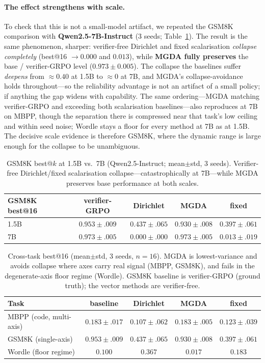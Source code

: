 \documentclass[11pt,a4paper]{article}
\begin{document}
\paragraph{The effect strengthens with scale.}
To check that this is not a small-model artifact, we repeated the GSM8K
comparison with \textbf{Qwen2.5-7B-Instruct} (3 seeds; Table~\ref{tab:scale}).
The result is the same phenomenon, sharper: verifier-free Dirichlet and fixed
scalarisation \emph{collapse completely} (best@16 $\to 0.000$ and $0.013$), while
\textbf{MGDA fully preserves} the base / verifier-GRPO level
($0.973\pm0.005$).  The collapse the baselines suffer \emph{deepens} from
$\approx0.40$ at 1.5B to $\approx0$ at 7B, and MGDA's collapse-avoidance holds
throughout---so the reliability advantage is not an artifact of a small policy;
if anything the gap widens with capability.  The same ordering---MGDA matching
verifier-GRPO and exceeding both scalarisation baselines---also reproduces at 7B
on MBPP, though the separation there is compressed near that task's low ceiling
and within seed noise; Wordle stays a floor for every method at 7B as at 1.5B.
The decisive scale evidence is therefore GSM8K, where the dynamic range is large
enough for the collapse to be unambiguous.

\begin{table}[h]\centering
\caption{GSM8K best@$k$ at 1.5B vs.\ 7B (Qwen2.5-Instruct; mean$\pm$std, 3
seeds). Verifier-free Dirichlet/fixed scalarisation collapse---catastrophically
at 7B---while MGDA preserves base performance at both scales.}
\label{tab:scale}
\begin{tabular}{@{}lcccc@{}}\toprule
GSM8K best@16 & verifier-GRPO & Dirichlet & MGDA & fixed \\ \midrule
1.5B & $0.953{\pm}.009$ & $0.437{\pm}.065$ & $\mathbf{0.930{\pm}.008}$ & $0.397{\pm}.061$ \\
7B   & $0.973{\pm}.005$ & $0.000{\pm}.000$ & $\mathbf{0.973{\pm}.005}$ & $0.013{\pm}.019$ \\
\bottomrule\end{tabular}
\end{table}

\begin{table}[h]\centering
\caption{Cross-task best@16 (mean$\pm$std, 3 seeds, $n{=}16$).  MGDA is
lowest-variance and avoids collapse where axes carry real signal (MBPP, GSM8K),
and fails in the degenerate-axis floor regime (Wordle).  GSM8K baseline is
verifier-GRPO (ground truth); the vector methods are verifier-free.}
\label{tab:crosstask}
\begin{tabular}{@{}lcccc@{}}\toprule
Task & baseline & Dirichlet & MGDA & fixed \\ \midrule
MBPP (code, multi-axis)   & $0.183{\pm}.017$ & $0.107{\pm}.062$ & $\mathbf{0.183{\pm}.005}$ & $0.123{\pm}.039$ \\
GSM8K (single-axis)       & $0.953{\pm}.009$ & $0.437{\pm}.065$ & $\mathbf{0.930{\pm}.008}$ & $0.397{\pm}.061$ \\
Wordle (floor regime)     & $0.100$          & $\mathbf{0.367}$ & $0.017$ & $0.183$ \\
\bottomrule\end{tabular}
\end{table}
\end{document}
